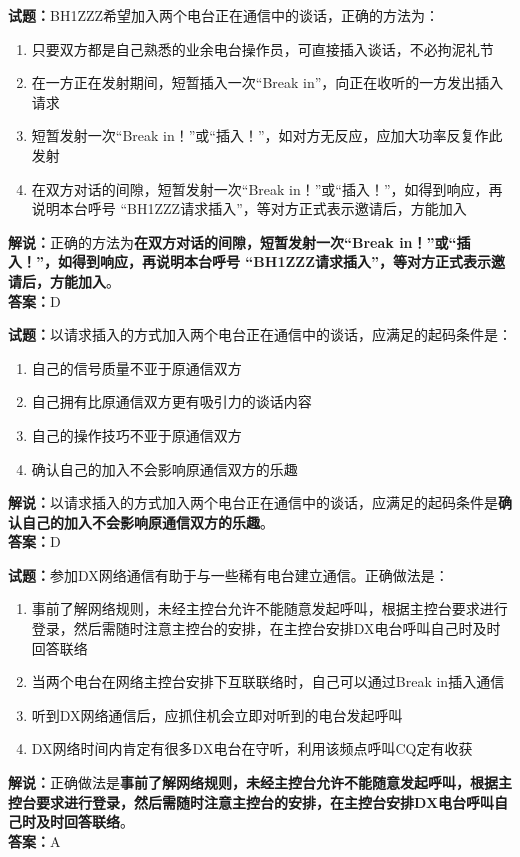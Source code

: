 \documentclass{ctexbook}
\begin{document}
\bigskip


\noindent\textbf{试题：}BH1ZZZ希望加入两个电台正在通信中的谈话，正确的方法为：
\begin{enumerate}[leftmargin=3em]
\item 只要双方都是自己熟悉的业余电台操作员，可直接插入谈话，不必拘泥礼节
\item 在一方正在发射期间，短暂插入一次“Break in”，向正在收听的一方发出插入请求
\item 短暂发射一次“Break in！”或“插入！”，如对方无反应，应加大功率反复作此发射
\item 在双方对话的间隙，短暂发射一次“Break in！”或“插入！”，如得到响应，再说明本台呼号 “BH1ZZZ请求插入”，等对方正式表示邀请后，方能加入
\end{enumerate}
\noindent\textbf{解说：}正确的方法为\textbf{在双方对话的间隙，短暂发射一次“Break in！”或“插入！”，如得到响应，再说明本台呼号 “BH1ZZZ请求插入”，等对方正式表示邀请后，方能加入}。\\\noindent\textbf{答案：}D



\bigskip


\noindent\textbf{试题：}以请求插入的方式加入两个电台正在通信中的谈话，应满足的起码条件是：
\begin{enumerate}[leftmargin=3em]
\item 自己的信号质量不亚于原通信双方
\item 自己拥有比原通信双方更有吸引力的谈话内容
\item 自己的操作技巧不亚于原通信双方
\item 确认自己的加入不会影响原通信双方的乐趣
\end{enumerate}
\noindent\textbf{解说：}以请求插入的方式加入两个电台正在通信中的谈话，应满足的起码条件是\textbf{确认自己的加入不会影响原通信双方的乐趣}。\\\noindent\textbf{答案：}D



\bigskip


\noindent\textbf{试题：}参加DX网络通信有助于与一些稀有电台建立通信。正确做法是：
\begin{enumerate}[leftmargin=3em]
\item 事前了解网络规则，未经主控台允许不能随意发起呼叫，根据主控台要求进行登录，然后需随时注意主控台的安排，在主控台安排DX电台呼叫自己时及时回答联络
\item 当两个电台在网络主控台安排下互联联络时，自己可以通过Break in插入通信
\item 听到DX网络通信后，应抓住机会立即对听到的电台发起呼叫
\item DX网络时间内肯定有很多DX电台在守听，利用该频点呼叫CQ定有收获
\end{enumerate}
\noindent\textbf{解说：}正确做法是\textbf{事前了解网络规则，未经主控台允许不能随意发起呼叫，根据主控台要求进行登录，然后需随时注意主控台的安排，在主控台安排DX电台呼叫自己时及时回答联络}。\\\noindent\textbf{答案：}A
\end{document}
